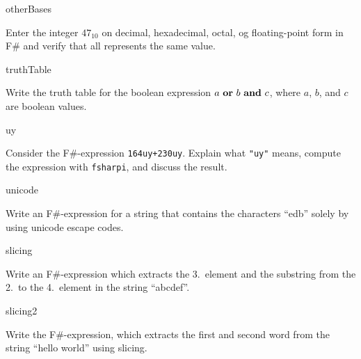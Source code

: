\begin{defproblem}{otherBases}
  \begin{onlyproblem}%
    Enter the integer $47_{10}$ on decimal, hexadecimal, octal, og floating-point form in F\# and verify that all represents the same value.
\end{onlyproblem}
\end{defproblem}

\begin{defproblem}{truthTable}
  \begin{onlyproblem}%
    Write the truth table for the boolean expression $a \text{ \texttt{\bf or} } b \text{ \texttt{\bf and} } c$, where $a$, $b$, and $c$ are boolean values.
  \end{onlyproblem}
\end{defproblem}

\begin{defproblem}{uy}
  \begin{onlyproblem}%
    Consider the F\#-expression \lstinline{164uy+230uy}. Explain what \lstinline{"uy"} means, compute the expression with \lstinline[language=console]{fsharpi}, and discuss the result.
  \end{onlyproblem}
\end{defproblem}

\begin{defproblem}{unicode}
  \begin{onlyproblem}%
    Write an F\#-expression for a string that contains the characters ``edb'' solely by using unicode escape codes.
  \end{onlyproblem}
\end{defproblem}

\begin{defproblem}{slicing}
  \begin{onlyproblem}%
    Write an F\#-expression which extracts the 3.\ element and the substring from the 2.\ to the 4.\ element in the string ``abcdef''.
  \end{onlyproblem}
\end{defproblem}

\begin{defproblem}{slicing2}
  \begin{onlyproblem}%
    Write the F\#-expression, which extracts the first and second word from the string ``hello world'' using slicing.
  \end{onlyproblem}
\end{defproblem}

